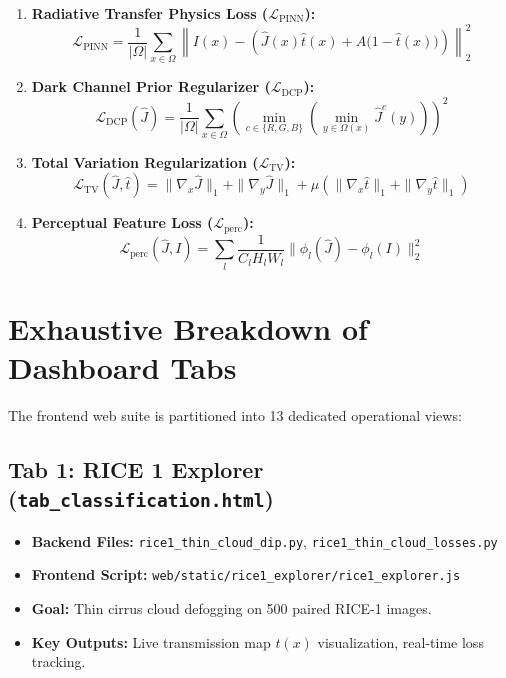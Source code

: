 \documentclass[11pt,a4paper]{article}
\begin{document}
\begin{tcolorbox}[colback=lightgraybg,colframe=secondaryteal,title=\textbf{Mathematical Loss Formulation Summary}]
\begin{enumerate}[leftmargin=*]
    \item \textbf{Radiative Transfer Physics Loss ($\mathcal{L}_{\text{PINN}}$):}
    $$\mathcal{L}_{\text{PINN}} = \frac{1}{|\Omega|} \sum_{x \in \Omega} \left\| I(x) - \left( \hat{J}(x)\hat{t}(x) + A\big(1 - \hat{t}(x)\big) \right) \right\|_2^2$$
    \item \textbf{Dark Channel Prior Regularizer ($\mathcal{L}_{\text{DCP}}$):}
    $$\mathcal{L}_{\text{DCP}}(\hat{J}) = \frac{1}{|\Omega|} \sum_{x \in \Omega} \left( \min_{c \in \{R,G,B\}} \left( \min_{y \in \Omega(x)} \hat{J}^c(y) \right) \right)^2$$
    \item \textbf{Total Variation Regularization ($\mathcal{L}_{\text{TV}}$):}
    $$\mathcal{L}_{\text{TV}}(\hat{J}, \hat{t}) = \|\nabla_x \hat{J}\|_1 + \|\nabla_y \hat{J}\|_1 + \mu \left( \|\nabla_x \hat{t}\|_1 + \|\nabla_y \hat{t}\|_1 \right)$$
    \item \textbf{Perceptual Feature Loss ($\mathcal{L}_{\text{perc}}$):}
    $$\mathcal{L}_{\text{perc}}(\hat{J}, I) = \sum_{l} \frac{1}{C_l H_l W_l} \|\phi_l(\hat{J}) - \phi_l(I)\|_2^2$$
\end{enumerate}
\end{tcolorbox}

\newpage
\section{Exhaustive Breakdown of Dashboard Tabs}

The frontend web suite is partitioned into 13 dedicated operational views:

\subsection{Tab 1: RICE 1 Explorer (\texttt{tab\_classification.html})}
\begin{itemize}[noitemsep]
    \item \textbf{Backend Files:} \texttt{rice1\_thin\_cloud\_dip.py}, \texttt{rice1\_thin\_cloud\_losses.py}
    \item \textbf{Frontend Script:} \texttt{web/static/rice1\_explorer/rice1\_explorer.js}
    \item \textbf{Goal:} Thin cirrus cloud defogging on 500 paired RICE-1 images.
    \item \textbf{Key Outputs:} Live transmission map $t(x)$ visualization, real-time loss tracking.
\end{itemize}
\end{document}
